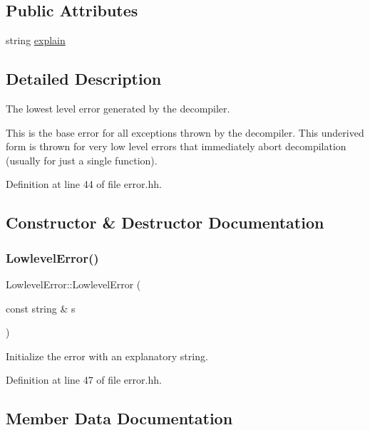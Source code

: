 \subsection*{Public Attributes}
\begin{DoxyCompactItemize}
\item 
string \mbox{\hyperlink{struct_lowlevel_error_afa821264468ba7772c966aab644796c4}{explain}}
\end{DoxyCompactItemize}


\subsection{Detailed Description}
The lowest level error generated by the decompiler. 

This is the base error for all exceptions thrown by the decompiler. This underived form is thrown for very low level errors that immediately abort decompilation (usually for just a single function). 

Definition at line 44 of file error.\+hh.



\subsection{Constructor \& Destructor Documentation}
\mbox{\label{struct_lowlevel_error_a73f4fa337533b013009b50f2bb68f57a}} 
\subsubsection{\texorpdfstring{LowlevelError()}{LowlevelError()}}
{\footnotesize\ttfamily Lowlevel\+Error\+::\+Lowlevel\+Error (\begin{DoxyParamCaption}\item[{const string \&}]{s }\end{DoxyParamCaption})\hspace{0.3cm}{\ttfamily [inline]}}



Initialize the error with an explanatory string. 



Definition at line 47 of file error.\+hh.



\subsection{Member Data Documentation}
\mbox{\label{struct_lowlevel_error_afa821264468ba7772c966aab644796c4}} 
